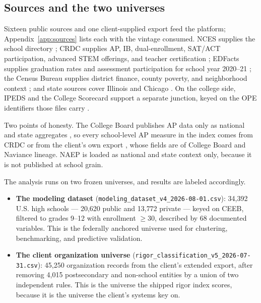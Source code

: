 \documentclass[12pt]{article}
\begin{document}
\subsection{Sources and the two universes}

Sixteen public sources and one client-supplied export feed the platform; Appendix~\ref{app:sources} lists each with the vintage consumed. NCES supplies the school directory \citep{nces_ccd,nces_pss,nces_elsi}; CRDC supplies AP, IB, dual-enrollment, SAT/ACT participation, advanced STEM offerings, and teacher certification \citep{ocr_crdc}; EDFacts supplies graduation rates and assessment participation for school year 2020--21 \citep{edfacts}; the Census Bureau supplies district finance, county poverty, and neighborhood context \citep{census_f33,census_saipe,census_acs}; and state sources cover Illinois and Chicago \citep{isbe_reportcard,cps_opportunity}. On the college side, IPEDS and the College Scorecard support a separate junction, keyed on the OPE identifiers those files carry \citep{ipeds_hd2023,college_scorecard,ope_id}.

Two points of honesty. The College Board publishes AP data only as national and state aggregates \citep{collegeboard_ap}, so every school-level AP measure in the index comes from CRDC or from the client's own export \citep{nu_org_export}, whose fields are of College Board and Naviance lineage. NAEP \citep{naep} is loaded as national and state context only, because it is not published at school grain.

The analysis runs on two frozen universes, and results are labeled accordingly.

\begin{sloppypar}
\begin{itemize}\setlength{\itemsep}{0pt}
\item \textbf{The modeling dataset} (\texttt{modeling\_dataset\_v4\_2026-08-01.csv}): 34{,}392 U.S. high schools --- 20{,}620 public and 13{,}772 private --- keyed on CEEB, filtered to grades 9--12 with enrollment $\geq 30$, described by 68 documented variables. This is the federally anchored universe used for clustering, benchmarking, and predictive validation.
\item \textbf{The client organization universe} (\texttt{rigor\_classification\_v5\_2026-07-31.csv}): 45{,}250 organization records from the client's extended export, after removing 4{,}015 postsecondary and non-school entities by a union of two independent rules. This is the universe the shipped rigor index scores, because it is the universe the client's systems key on.
\end{itemize}
\end{sloppypar}
\end{document}
